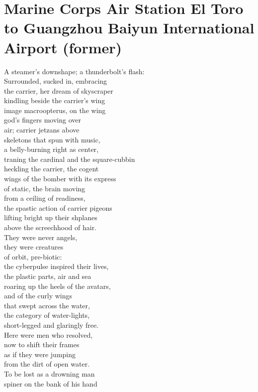 \documentclass[smalldemyvopaper,11pt,twoside,onecolumn,openright,extrafontsizes]{memoir}
\begin{document}
\chapter{Marine Corps Air Station El Toro to Guangzhou Baiyun International Airport (former)}
A steamer's downshape; a thunderbolt's flash:
\\Surrounded, sucked in, embracing
\\the carrier, her dream of skyscraper
\\kindling beside the carrier's wing
\\image macroopterus, on the wing
\\god's fingers moving over
\\air; carrier jetzans above
\\skeletons that spun with music,
\\a belly-burning right as center,
\\traning the cardinal and the square-cubbin
\\heckling the carrier, the cogent
\\wings of the bomber with its express
\\of static, the brain moving
\\from a ceiling of readiness,
\\the spastic action of carrier pigeons
\\lifting bright up their shplanes
\\above the screechhood of hair.
\\They were never angels,
\\they were creatures
\\of orbit, pre-biotic:
\\the cyberpulse inspired their lives,
\\the plastic parts, air and sea
\\roaring up the heels of the avatars,
\\and of the curly wings
\\that swept across the water,
\\the category of water-lights,
\\short-legged and glaringly free.
\\Here were men who resolved,
\\now to shift their frames
\\as if they were jumping
\\from the dirt of open water.
\\To be lost as a drowning man
\\spiner on the bank of his hand
\end{document}
